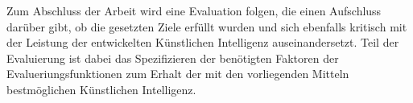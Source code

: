 Zum Abschluss der Arbeit wird eine Evaluation folgen, die einen Aufschluss darüber gibt, ob die gesetzten Ziele erfüllt wurden und sich ebenfalls kritisch mit der Leistung der entwickelten Künstlichen Intelligenz auseinandersetzt. Teil der Evaluierung ist dabei das Spezifizieren der benötigten Faktoren der Evalueriungsfunktionen zum Erhalt der mit den vorliegenden Mitteln bestmöglichen Künstlichen Intelligenz.






